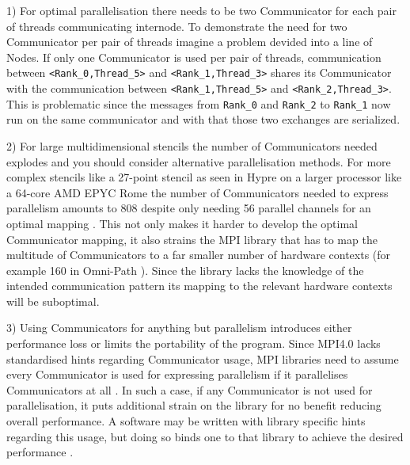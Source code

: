 \documentclass[sigconf]{acmart} %
\begin{document}
1) For optimal parallelisation there needs to be two Communicator for each pair of threads communicating internode.
To demonstrate the need for two Communicator per pair of threads imagine a problem devided into a line of Nodes.
If only one Communicator is used per pair of threads, communication between \verb|<Rank_0,Thread_5>| and \verb|<Rank_1,Thread_3>| shares its Communicator with the communication between \verb|<Rank_1,Thread_5>| and \verb|<Rank_2,Thread_3>|.
This is problematic since the messages from \verb|Rank_0| and \verb|Rank_2| to \verb|Rank_1| now run on the same communicator and with that those two exchanges are serialized.

2) For large multidimensional stencils the number of Communicators needed explodes and you should consider alternative parallelisation methods.
For more complex stencils like a 27-point stencil as seen in Hypre\cite{hypre2020} on a larger processor like a 64-core AMD EPYC Rome the number of Communicators needed to express parallelism amounts to 808 despite only needing 56 parallel channels for an optimal mapping \cite{zambreLessonsLearned2022}.
This not only makes it harder to develop the optimal Communicator mapping, it also strains the MPI library that has to map the multitude of Communicators to a far smaller number of hardware contexts (for example 160 in Omni-Path \cite{intelOmniPath}).
Since the library lacks the knowledge of the intended communication pattern its mapping to the relevant hardware contexts will be suboptimal.

3) Using Communicators for anything but parallelism introduces either performance loss or limits the portability of the program.
Since MPI4.0 lacks standardised hints regarding Communicator usage, MPI libraries need to assume every Communicator is used for expressing parallelism if it parallelises Communicators at all .
In such a case, if any Communicator is not used for parallelisation, it puts additional strain on the library for no benefit reducing overall performance.
A software may be written with library specific hints regarding this usage, but doing so binds one to that library to achieve the desired performance \cite{zambreLessonsLearned2022}.
\end{document}
